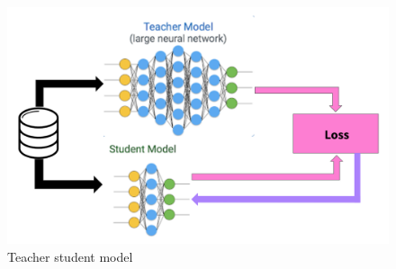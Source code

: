 \documentclass[journal, a4paper]{IEEEtran}
\begin{document}
\begin{figure}[!hbt]
	\begin{center}
		\includegraphics[scale=0.20]{images/distillation.png}
		\caption{Teacher student model}
		\label{fig:teachstud}
	\end{center}
\end{figure}
\end{document}
